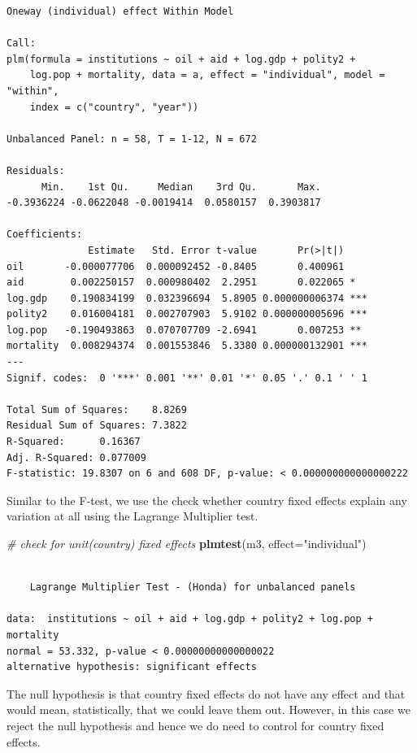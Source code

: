 \documentclass[]{article}
\newenvironment{Shaded}{\begin{snugshade}}{\end{snugshade}}
\newcommand{\KeywordTok}[1]{\textcolor[rgb]{0.13,0.29,0.53}{\textbf{#1}}}
\newcommand{\DataTypeTok}[1]{\textcolor[rgb]{0.13,0.29,0.53}{#1}}
\newcommand{\StringTok}[1]{\textcolor[rgb]{0.31,0.60,0.02}{#1}}
\newcommand{\CommentTok}[1]{\textcolor[rgb]{0.56,0.35,0.01}{\textit{#1}}}
\newcommand{\NormalTok}[1]{#1}
\theoremstyle{definition}
\theoremstyle{definition}
\theoremstyle{definition}
\theoremstyle{remark}
\begin{document}
\begin{verbatim}
Oneway (individual) effect Within Model

Call:
plm(formula = institutions ~ oil + aid + log.gdp + polity2 + 
    log.pop + mortality, data = a, effect = "individual", model = "within", 
    index = c("country", "year"))

Unbalanced Panel: n = 58, T = 1-12, N = 672

Residuals:
      Min.    1st Qu.     Median    3rd Qu.       Max. 
-0.3936224 -0.0622048 -0.0019414  0.0580157  0.3903817 

Coefficients:
              Estimate   Std. Error t-value       Pr(>|t|)    
oil       -0.000077706  0.000092452 -0.8405       0.400961    
aid        0.002250157  0.000980402  2.2951       0.022065 *  
log.gdp    0.190834199  0.032396694  5.8905 0.000000006374 ***
polity2    0.016004181  0.002707903  5.9102 0.000000005696 ***
log.pop   -0.190493863  0.070707709 -2.6941       0.007253 ** 
mortality  0.008294374  0.001553846  5.3380 0.000000132901 ***
---
Signif. codes:  0 '***' 0.001 '**' 0.01 '*' 0.05 '.' 0.1 ' ' 1

Total Sum of Squares:    8.8269
Residual Sum of Squares: 7.3822
R-Squared:      0.16367
Adj. R-Squared: 0.077009
F-statistic: 19.8307 on 6 and 608 DF, p-value: < 0.000000000000000222
\end{verbatim}

Similar to the F-test, we use the check whether country fixed effects
explain any variation at all using the Lagrange Multiplier test.

\begin{Shaded}
\begin{Highlighting}[]
\CommentTok{# check for unit(country) fixed effects}
\KeywordTok{plmtest}\NormalTok{(m3, }\DataTypeTok{effect=}\StringTok{"individual"}\NormalTok{)}
\end{Highlighting}
\end{Shaded}

\begin{verbatim}

    Lagrange Multiplier Test - (Honda) for unbalanced panels

data:  institutions ~ oil + aid + log.gdp + polity2 + log.pop + mortality
normal = 53.332, p-value < 0.00000000000000022
alternative hypothesis: significant effects
\end{verbatim}

The null hypothesis is that country fixed effects do not have any effect
and that would mean, statistically, that we could leave them out.
However, in this case we reject the null hypothesis and hence we do need
to control for country fixed effects.
\end{document}
